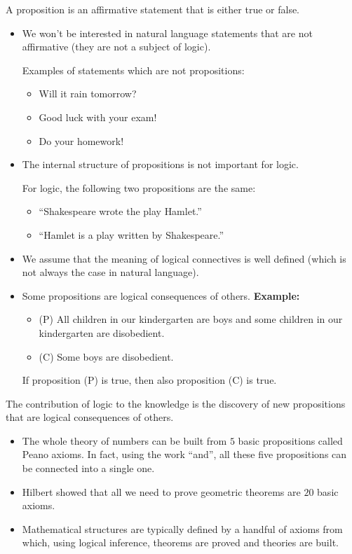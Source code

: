 \documentclass[11pt,paper=b5,footinclude,headinclude]{scrbook} %
\theoremstyle{remark}
\theoremstyle{definition} %
\theoremstyle{theorem} %
\begin{document}
A proposition is an affirmative statement that is either true or false.
\begin{itemize}
  \item We won't be interested in natural language statements that are not affirmative (they are not a subject of logic).

  Examples of statements which are not propositions: 
  \begin{itemize}
      \item Will it rain tomorrow? 
      \item Good luck with your exam! 
      \item Do your homework!
  \end{itemize}
  \item The internal structure of propositions is not important for logic.

  For logic, the following two propositions are the same:
  \begin{itemize}
    \item ``Shakespeare wrote the play Hamlet.''

    \item ``Hamlet is a play written by Shakespeare.''
  \end{itemize}
  \item We assume that the meaning of logical connectives is well defined (which is not always the case in natural language).
  \item 
  Some propositions are logical consequences of others.
\textbf{Example:}
\begin{itemize}
  \item (P) All children in our kindergarten are boys and some children in our kindergarten are disobedient.
  \item (C) Some boys are disobedient.
\end{itemize}
If proposition (P) is true, then also proposition (C) is true.
\end{itemize}

The contribution of logic to the knowledge is the discovery of new propositions that are logical consequences of others.
\begin{itemize}
  \item The whole theory of numbers can be built from $5$ basic propositions called Peano axioms. In fact, using the work ``and'', all these five propositions can be connected into a single one.
  \item Hilbert showed that all we need to prove geometric theorems are $20$ basic axioms.
  \item Mathematical structures are typically defined by a handful of axioms from which, using logical inference, theorems are proved and theories are built.
\end{itemize}
\end{document}
